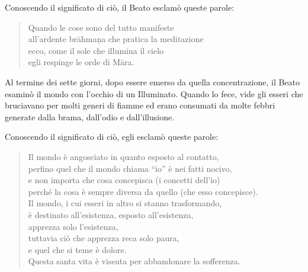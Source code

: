 Conoscendo il significato di ciò, il Beato esclamò queste parole:

\begin{quote}
Quando le cose sono del tutto manifeste \\
all’ardente brāhmaṇa che pratica la meditazione \\
ecco, come il sole che illumina il cielo \\
egli respinge le orde di Māra.
\end{quote}


Al termine dei sette giorni,
dopo essere emerso da quella concentrazione, il Beato esaminò il mondo con
l’occhio di un Illuminato. Quando lo fece, vide gli esseri che bruciavano per
molti generi di fiamme ed erano consumati da molte febbri generate dalla brama,
dall’odio e dall’illusione.

Conoscendo il significato di ciò, egli esclamò queste parole:

\begin{quote}

  Il mondo è angosciato in quanto esposto al contatto, \\
  perfino quel che il mondo chiama “io” è nei fatti nocivo, \\
  e non importa che cosa concepisca (i concetti dell’io) \\
  perché la cosa è sempre diversa da quello (che esso concepisce). \\
  Il mondo, i cui esseri in altro si stanno trasformando, \\
  è destinato all’esistenza, esposto all’esistenza, \\
  apprezza solo l’esistenza, \\
  tuttavia ciò che apprezza reca solo paura, \\
  e quel che si teme è dolore. \\
  Questa santa vita è vissuta per abbandonare la sofferenza.

\end{quote}

